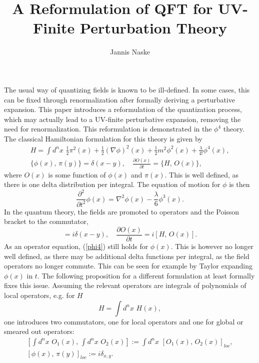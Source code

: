 \documentclass{article}
\title{A Reformulation of QFT for UV-Finite Perturbation Theory}
\author{Jannis Naske}
\begin{document}
\maketitle

The usual way of quantizing fields is known to be ill-defined.
In some cases, this can be fixed through renormalization after formally deriving a perturbative expansion.
This paper introduces a reformulation of the quantization process, which may actually lead to a UV-finite perturbative expansion,
removing the need for renormalization. This reformulation is demonstrated in the $\phi^4$ theory.
The classical Hamiltonian formulation for this theory is given by
\begin{equation}\begin{gathered}
    H = \int d^nx \,\, \frac{1}{2} \pi^2(x) + \frac{1}{2} (\nabla\phi)^2(x) + \frac{1}{2} m^2\phi^2(x) + \frac{\lambda}{4!} \phi^4(x),\\
    \{\phi(x),\,\pi(y)\} = \delta(x - y), \quad \frac{\partial O(x)}{\partial t} = \{H,\,O(x)\},
\end{gathered}\end{equation}
where $O(x)$ is some function of $\phi(x)$ and $\pi(x)$. This is well defined, as there is one delta distribution per integral.
The equation of motion for $\phi$ is then
\begin{equation}\label{phi4}
    \frac{\partial^2}{\partial t^2} \phi(x) = \nabla^2\phi(x) - \frac{\lambda}{6} \phi^3(x).
\end{equation}
In the quantum theory, the fields are promoted to operators and the Poisson bracket to the commutator,
\begin{equation}
    [\phi(x),\,\pi(y)] = i\delta(x - y), \quad \frac{\partial O(x)}{\partial t} = i[H,\,O(x)].
\end{equation}
As an operator equation, (\ref{phi4}) still holds for $\phi(x)$. This is however no longer well defined,
as there may be additional delta functions per integral, as the field operators no longer commute.
This can be seen for example by Taylor expanding $\phi(x)$ in $t$.
The following proposition for a different formulation at least formally fixes this issue.
Assuming the relevant operators are integrals of polynomials of local operators, e.g. for $H$
\begin{equation}
    H = \int d^nx \,\, H(x),
\end{equation}
one introduces two commutators, one for local operators and one for global or smeared out operators:
\begin{equation}
    \begin{gathered}
        \left[ \int d^nx \,\, O_1(x), \, \int d^nx \,\, O_2(x) \right] := \int d^nx \,\, \left[ O_1(x), \, O_2(x) \right]_{loc},\\
        \left[ \phi(x), \, \pi(y) \right]_{loc} := i\delta_{x,y}.
    \end{gathered}
\end{equation}
\end{document}
